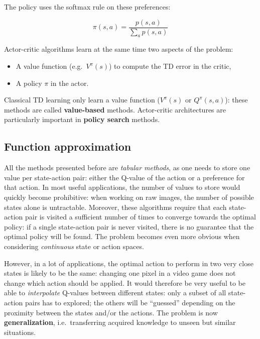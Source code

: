 \documentclass[
  letterpaper,
  DIV=11,
  numbers=noendperiod]{scrreprt}
\providecommand{\tightlist}{%
  \setlength{\itemsep}{0pt}\setlength{\parskip}{0pt}}\usepackage{longtable,booktabs,array}
\begin{document}
The policy uses the softmax rule on these preferences:

\[
    \pi(s, a) = \frac{p(s, a)}{\sum_a p(s, a)}
\]

Actor-critic algorithms learn at the same time two aspects of the
problem:

\begin{itemize}
\tightlist
\item
  A value function (e.g.~\(V^\pi(s)\)) to compute the TD error in the
  critic,
\item
  A policy \(\pi\) in the actor.
\end{itemize}

Classical TD learning only learn a value function (\(V^\pi(s)\) or
\(Q^\pi(s, a)\)): these methods are called \textbf{value-based} methods.
Actor-critic architectures are particularly important in \textbf{policy
search} methods.

\hypertarget{function-approximation}{%
\subsection{Function approximation}\label{function-approximation}}

All the methods presented before are \emph{tabular methods}, as one
needs to store one value per state-action pair: either the Q-value of
the action or a preference for that action. In most useful applications,
the number of values to store would quickly become prohibitive: when
working on raw images, the number of possible states alone is
untractable. Moreover, these algorithms require that each state-action
pair is visited a sufficient number of times to converge towards the
optimal policy: if a single state-action pair is never visited, there is
no guarantee that the optimal policy will be found. The problem becomes
even more obvious when considering \emph{continuous} state or action
spaces.

However, in a lot of applications, the optimal action to perform in two
very close states is likely to be the same: changing one pixel in a
video game does not change which action should be applied. It would
therefore be very useful to be able to \emph{interpolate} Q-values
between different states: only a subset of all state-action pairs has to
explored; the others will be ``guessed'' depending on the proximity
between the states and/or the actions. The problem is now
\textbf{generalization}, i.e.~transferring acquired knowledge to unseen
but similar situations.
\end{document}
